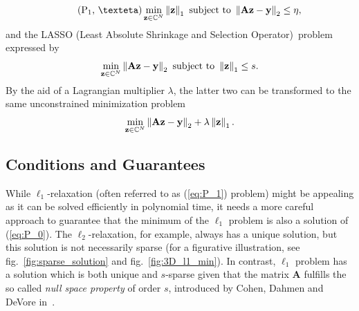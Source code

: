 \begin{equation}
    \tag{P\textsubscript{1}, \texteta}\label{eq:P_1_noisy}
    \min_{\mathbf{z} \in \mathbb{C}^N} \norm{\mathbf{z}}_1 \text{ subject to } \norm{\mathbf{Az} - \mathbf{y}}_2 \le \eta,
\end{equation}
and the LASSO (Least Absolute Shrinkage and Selection Operator)~\citationneeded problem expressed by
\[\min_{\mathbf{z} \in \mathbb{C}^N} \left\lVert\mathbf{Az} - \mathbf{y}\right\rVert_2 \text{ subject to } \left\lVert\mathbf{z}\right\rVert_1 \le s.\]
By the aid of a Lagrangian multiplier $\lambda$, the latter two can be transformed to the same unconstrained minimization problem
\[\min_{\mathbf{z} \in \mathbb{C}^N} \left\lVert\mathbf{Az} - \mathbf{y}\right\rVert_2 + \lambda \left\lVert\mathbf{z}\right\rVert_1.\]

\subsection{Conditions and Guarantees}
While $\ell_1$-relaxation (often referred to as (\ref{eq:P_1}) problem) might be appealing as it can be solved efficiently in polynomial time, it needs a more careful approach to guarantee that the minimum of the $\ell_1$ problem is also a solution of (\ref{eq:P_0}). The $\ell_2$-relaxation, for example, always has a unique solution, but this solution is not necessarily sparse (for a figurative illustration, see fig.~\ref{fig:sparse_solution} and fig.~\ref{fig:3D_l1_min}). In contrast, $\ell_1$ problem has a solution which is both unique and $s$-sparse given that the matrix $\mathbf{A}$ fulfills the so called \textit{null space property} of order $s$, introduced by Cohen, Dahmen and DeVore in~\cite{cohen_compressed_2009}.

